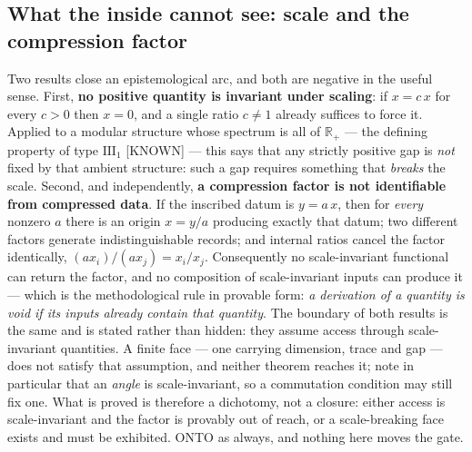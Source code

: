 \documentclass[11pt]{article}
\theoremstyle{definition}\newtheorem{deriv}{Derivation}
\begin{document}
\subsection*{What the inside cannot see: scale and the compression factor}Two results close an epistemological arc, and both are negative in the useful sense. First, \textbf{no positive quantity is invariant under scaling}: if $x = c\,x$ for every $c>0$ then $x=0$, and a single ratio $c\neq 1$ already suffices to force it. Applied to a modular structure whose spectrum is all of $\mathbb{R}_+$ --- the defining property of type $\mathrm{III}_1$ \textsf{[KNOWN]} --- this says that any strictly positive gap is \emph{not} fixed by that ambient structure: such a gap requires something that \emph{breaks} the scale. Second, and independently, \textbf{a compression factor is not identifiable from compressed data}. If the inscribed datum is $y = a\,x$, then for \emph{every} nonzero $a$ there is an origin $x=y/a$ producing exactly that datum; two different factors generate indistinguishable records; and internal ratios cancel the factor identically, $(a x_i)/(a x_j) = x_i/x_j$. Consequently no scale-invariant functional can return the factor, and no composition of scale-invariant inputs can produce it --- which is the methodological rule in provable form: \emph{a derivation of a quantity is void if its inputs already contain that quantity}. The boundary of both results is the same and is stated rather than hidden: they assume access through scale-invariant quantities. A finite face --- one carrying dimension, trace and gap --- does not satisfy that assumption, and neither theorem reaches it; note in particular that an \emph{angle} is scale-invariant, so a commutation condition may still fix one. What is proved is therefore a dichotomy, not a closure: either access is scale-invariant and the factor is provably out of reach, or a scale-breaking face exists and must be exhibited. \textsf{ONTO} as always, and nothing here moves the gate.
\end{document}

